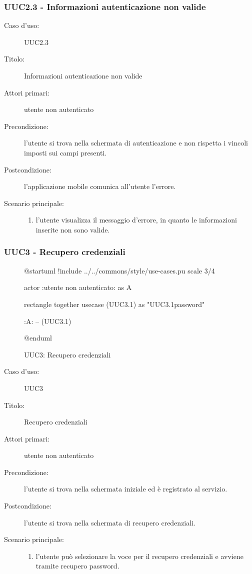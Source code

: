 \documentclass[casi-duso]{subfiles}
\begin{document}
\subsubsection{UUC2.3 - Informazioni autenticazione non valide}%
\label{subsub:UUC2.3utente}
\begin{description}
  \item[Caso d’uso:] UUC2.3
  \item[Titolo:] Informazioni autenticazione non valide
  \item[Attori primari:] utente non autenticato
  \item[Precondizione:] l'utente si trova nella schermata di autenticazione e non rispetta i vincoli imposti sui campi presenti.
  \item[Postcondizione:] l'applicazione mobile comunica all'utente l'errore.
  \item[Scenario principale:]
        \begin{enumerate}
          \item l'utente visualizza il messaggio d'errore, in quanto le informazioni inserite non sono valide.
        \end{enumerate}
\end{description}

\subsubsection{UUC3 - Recupero credenziali}%
\label{subsub:UUC3utente}

\begin{figure}[h!] 
  \centering 
  \begin{plantuml}
  @startuml
  !include ../../commons/style/use-cases.pu
  scale 3/4

  actor :utente non autenticato: as A

  rectangle {
    together {
      usecase (UUC3.1) as "UUC3.1\nRecupero password" 
    }
  }

  :A: -- (UUC3.1)

  @enduml
  \end{plantuml} 
  \caption{UUC3: Recupero credenziali} 
  \label{fig:uuc3} 
\end{figure}

\begin{description}
  \item[Caso d’uso:] UUC3
  \item[Titolo:] Recupero credenziali
  \item[Attori primari:] utente non autenticato
  \item[Precondizione:] l'utente si trova nella schermata iniziale ed è registrato al servizio.
  \item[Postcondizione:] l'utente si trova nella schermata di recupero credenziali.
  \item[Scenario principale:]
        \begin{enumerate}
          \item l'utente può selezionare la voce per il recupero credenziali e avviene tramite recupero password.
        \end{enumerate}
\end{description}
\end{document}
